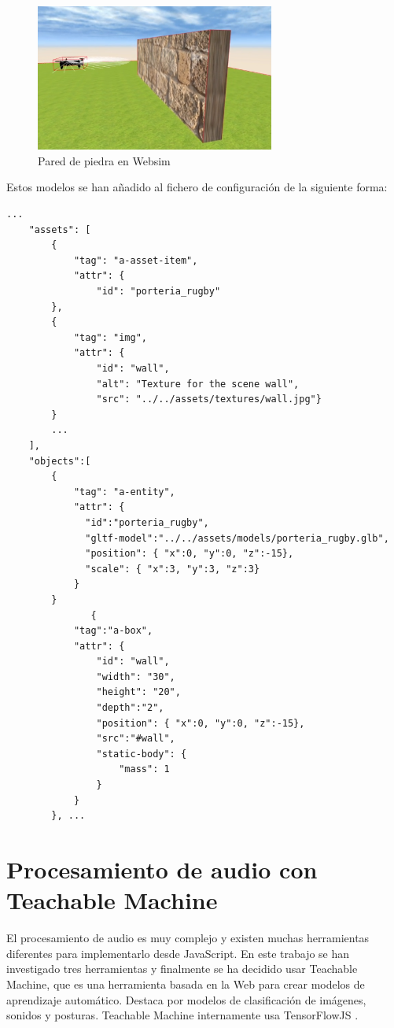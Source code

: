 \begin{figure}[H]
\centering
    \includegraphics[width=0.7\textwidth, height=0.5\textwidth]{chapters/images/pared.png}
    \caption{Pared de piedra en Websim}
    \label{fig:f1}
  \end{figure}

Estos modelos se han añadido al fichero de configuración de la siguiente forma:
\begin{lstlisting}
...
    "assets": [
        {
            "tag": "a-asset-item",
            "attr": {
                "id": "porteria_rugby"
		},
		{
            "tag": "img",
            "attr": {
                "id": "wall",
                "alt": "Texture for the scene wall",
                "src": "../../assets/textures/wall.jpg"}
        }
		...
    ],
    "objects":[ 
        {
            "tag": "a-entity",
            "attr": {
              "id":"porteria_rugby",
              "gltf-model":"../../assets/models/porteria_rugby.glb",
              "position": { "x":0, "y":0, "z":-15},
              "scale": { "x":3, "y":3, "z":3}
            }
        }
               {
            "tag":"a-box",
            "attr": {
                "id": "wall",
                "width": "30",
                "height": "20",
                "depth":"2",
                "position": { "x":0, "y":0, "z":-15},
                "src":"#wall",
                "static-body": {
                    "mass": 1
                }
            }
        }, ...
\end{lstlisting}


\section{Procesamiento de audio con Teachable Machine}

El procesamiento de audio es muy complejo y existen muchas herramientas diferentes para implementarlo desde JavaScript. En este trabajo se han investigado tres herramientas y finalmente se ha decidido usar Teachable Machine, que es una herramienta basada en la Web para crear modelos de aprendizaje automático. Destaca por modelos de clasificación de imágenes, sonidos y posturas. Teachable Machine internamente usa TensorFlowJS . 

